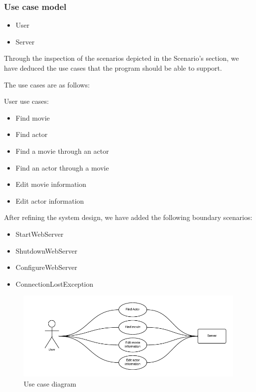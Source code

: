 \subsubsection{Use case model}

\begin{itemize}
	\setlength{\itemsep}{-5pt}
	\item User
	\item Server
\end{itemize}

Through the inspection of the scenarios depicted in the Scenario’s section, we have deduced the use cases that the program should be able to support.

The use cases are as follows:

User use cases:
\begin{itemize}
	\setlength{\itemsep}{-5pt}
	\item Find movie
	\item Find actor
	\item Find a movie through an actor
	\item Find an actor through a movie
	\item Edit movie information
	\item Edit actor information
\end{itemize}

After refining the system design, we have added the following boundary scenarios:
\begin{itemize}
	\setlength{\itemsep}{-5pt}
	
	\item StartWebServer
	\item ShutdownWebServer
	\item ConfigureWebServer
	\item ConnectionLostException
\end{itemize}

\begin{figure}[H]
\includegraphics[width=\linewidth]{img/RAD/usecasediagram.png}
\caption{Use case diagram}
\label{fig:use case diagram}
\end{figure}


